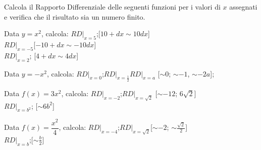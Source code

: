 \begin{esercizio}\label{ese:dif05}
Calcola il Rapporto Differenziale delle seguenti funzioni per i valori di \(x\) 
assegnati e verifica che il risultato sia un numero finito.
\begin{enumeratea}
  \item  Data \(y=x^2\), calcola:
  \(RD|_{x=5}\);\hfill [\(10+dx\sim 10dx\)]\\
  \(RD|_{x=-5}\)\hfill [\(-10+dx\sim -10 dx\)]\\
  \(RD|_{x=2}\); \hfill [\(4+dx\sim 4dx\)]
  \item Data \(y=-x^2\), calcola:
  \(RD|_{x=0}\);\hspace{3em}\(RD|_{x=\frac{1}{2}}\)\hspace{3em}\(RD|_{x=a}\)
  \hfill [\(\sim 0\); \(\sim -1\), \(\sim -2a\)];
  \item Data \(f(x)=3x^2\), calcola:
  \(RD|_{x=-2}\);\hspace{3em}\(RD|_{x=\sqrt{2}}\)
  \hfill [\(\sim -12\); \(6\sqrt{2}\)]\\
  \(RD|_{x=b^2}\); \hfill [\(\sim 6b^2\)]
  \item Data \(f(x)=\dfrac{x^2}{4}\), calcola:
  \(RD|_{x=-4}\);\hspace{3em}\(RD|_{x=\sqrt{2}}\)\hfill [\(\sim-2\); 
  \(\sim \frac{\sqrt{2}}{2}\)]\\
  \(RD|_{x=b}\);\hfill [\(\sim\frac{b}{2}\)]
 \end{enumeratea}
\end{esercizio}

